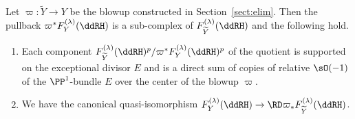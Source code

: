 \begin{lemma*} Let $\varpi\colon \widetilde{Y} \to Y$ be the blowup constructed in Section~{\rm \ref{sect:elim}}. Then the pullback $\varpi^*F_Y^{(\lambda)}(\ddRH)$ is a sub-complex of $F_{\widetilde{Y}}^{(\lambda)}(\ddRH)$
and the following hold.
\begin{enumerate}\itemsep=0pt
\item Each component $F_{\widetilde{Y}}^{(\lambda)}(\ddRH)^p/\varpi^*F_Y^{(\lambda)}(\ddRH)^p$ of the quotient is supported on the exceptional divisor $E$ and is a direct sum of copies of relative $\sO(-1)$ of the $\PP^1$-bundle $E$ over the center of the blowup $\varpi$.
\item We have the canonical quasi-isomorphism $F_Y^{(\lambda)}(\ddRH) \to \RD\varpi_*F_{\widetilde{Y}}^{(\lambda)}(\ddRH)$.
\end{enumerate}
\end{lemma*}


